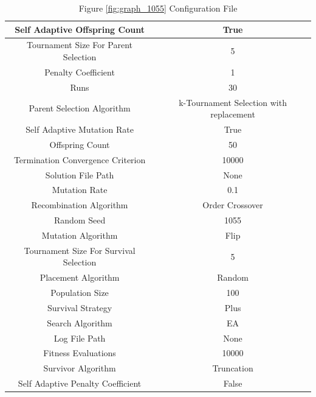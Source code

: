 \documentclass{standalone}
\begin{document}
\begin{table}[!htb]
	\centering
	\caption{Figure \ref{fig:graph_1055} Configuration File}
	\label{tab:graph_1055}
	\begin{tabular}{| c | c |}
		\hline
		Self Adaptive Offspring Count		& True		 \\
		\hline
		Tournament Size For Parent Selection		& 5		 \\
		\hline
		Penalty Coefficient		& 1		 \\
		\hline
		Runs		& 30		 \\
		\hline
		Parent Selection Algorithm		& k-Tournament Selection with replacement		 \\
		\hline
		Self Adaptive Mutation Rate		& True		 \\
		\hline
		Offspring Count		& 50		 \\
		\hline
		Termination Convergence Criterion		& 10000		 \\
		\hline
		Solution File Path		& None		 \\
		\hline
		Mutation Rate		& 0.1		 \\
		\hline
		Recombination Algorithm		& Order Crossover		 \\
		\hline
		Random Seed		& 1055		 \\
		\hline
		Mutation Algorithm		& Flip		 \\
		\hline
		Tournament Size For Survival Selection		& 5		 \\
		\hline
		Placement Algorithm		& Random		 \\
		\hline
		Population Size		& 100		 \\
		\hline
		Survival Strategy		& Plus		 \\
		\hline
		Search Algorithm		& EA		 \\
		\hline
		Log File Path		& None		 \\
		\hline
		Fitness Evaluations		& 10000		 \\
		\hline
		Survivor Algorithm		& Truncation		 \\
		\hline
		Self Adaptive Penalty Coefficient		& False		 \\
		\hline
	\end{tabular}
\end{table}
\end{document}
